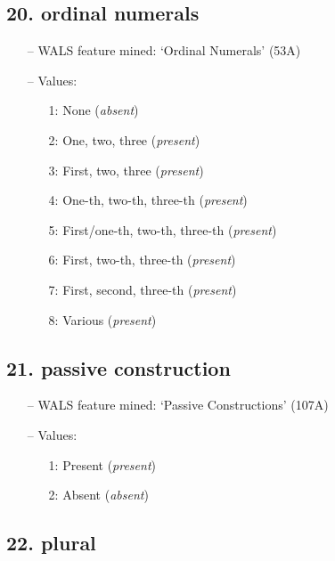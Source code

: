 \subsection*{20. ordinal numerals}

\begin{itemize}
\item[--] WALS feature mined: `Ordinal Numerals' (53A)
\item[--] Values:

\begin{enumerate}
\item[1:] None (\emph{absent})
\item[2:] One, two, three (\emph{present})
\item[3:] First, two, three (\emph{present})
\item[4:] One-th, two-th, three-th (\emph{present})
\item[5:] First/one-th, two-th, three-th (\emph{present})
\item[6:] First, two-th, three-th (\emph{present})
\item[7:] First, second, three-th (\emph{present})
\item[8:] Various (\emph{present})
\end{enumerate}
\end{itemize}

\subsection*{21. passive construction}

\begin{itemize}
\item[--] WALS feature mined: `Passive Constructions' (107A)
\item[--] Values:

\begin{enumerate}
\item[1:] Present (\emph{present})
\item[2:] Absent (\emph{absent})
\end{enumerate}
\end{itemize}

\subsection*{22. plural}

